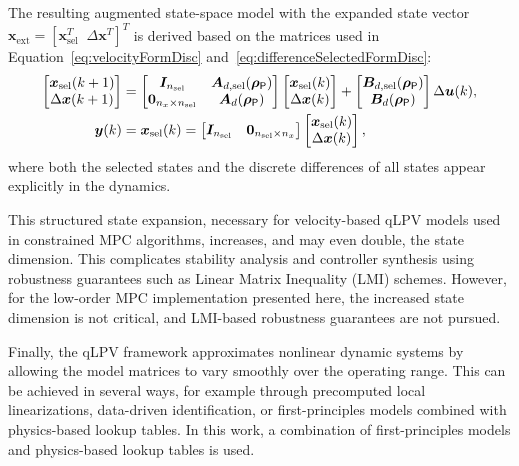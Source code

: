 The resulting augmented state-space model with the expanded state vector $\bm{x}_{\text{ext}} =[\bm{x}_{\text{sel}}^T \; \; \Delta\bm{x}^T ]^T$ is derived based on the matrices used in Equation~\eqref{eq:velocityFormDisc} and~\eqref{eq:differenceSelectedFormDisc}:
\begin{equation}\label{eq:discreteVelocityqLPV}
    \begin{aligned}
        \begin{bmatrix} \bm{x}_{\text{sel}}(k+1) \\ \Delta\bm{x}(k+1) \end{bmatrix} 
        &= \begin{bmatrix} \bm{I}_{n_{\text{sel}}} & \bm{A}_{d,\text{sel}}(\bm{\rho}_{\mathsf{P}}) \\ 
            \bm{0}_{n_x \times n_\text{sel}} & \bm{A}_d(\bm{\rho}_{\mathsf{P}}) 
        \end{bmatrix}
        \begin{bmatrix} \bm{x}_{\text{sel}}(k) \\ \Delta\bm{x}(k) \end{bmatrix}
        + \begin{bmatrix} \bm{B}_{d,\text{sel}}(\bm{\rho}_{\mathsf{P}}) \\ \bm{B}_d(\bm{\rho}_{\mathsf{P}}) \end{bmatrix} \Delta\bm{u}(k), \\
        \bm{y}(k) &= \bm{x}_{\text{sel}}(k) = \begin{bmatrix} \bm{I}_{n_{\text{sel}}} & \bm{0}_{n_\text{sel} \times n_x} \end{bmatrix} 
        \begin{bmatrix} \bm{x}_{\text{sel}}(k) \\ \Delta\bm{x}(k) \end{bmatrix},
    \end{aligned}
\end{equation}
where both the selected states and the discrete differences of all states appear explicitly in the dynamics. 

This structured state expansion, necessary for velocity-based qLPV models used in constrained MPC algorithms, increases, and may even double, the state dimension. This complicates stability analysis and controller synthesis using robustness guarantees such as Linear Matrix Inequality (LMI) schemes. However, for the low-order MPC implementation presented here, the increased state dimension is not critical, and LMI-based robustness guarantees are not pursued.

Finally, the qLPV framework approximates nonlinear dynamic systems by allowing the model matrices to vary smoothly over the operating range. This can be achieved in several ways, for example through precomputed local linearizations, data-driven identification, or first-principles models combined with physics-based lookup tables. In this work, a combination of first-principles models and physics-based lookup tables is used.


